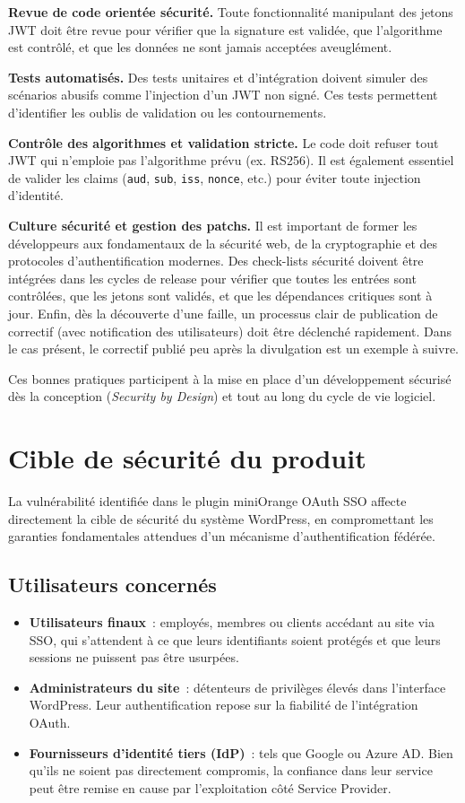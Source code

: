 \documentclass[a4paper,12pt]{article}
\begin{document}
\textbf{Revue de code orientée sécurité.} Toute fonctionnalité manipulant des jetons JWT doit être revue pour vérifier que la signature est validée, que l’algorithme est contrôlé, et que les données ne sont jamais acceptées aveuglément.

\textbf{Tests automatisés.} Des tests unitaires et d’intégration doivent simuler des scénarios abusifs comme l’injection d’un JWT non signé. Ces tests permettent d'identifier les oublis de validation ou les contournements.


\textbf{Contrôle des algorithmes et validation stricte.} Le code doit refuser tout JWT qui n’emploie pas l’algorithme prévu (ex. RS256). Il est également essentiel de valider les claims (\texttt{aud}, \texttt{sub}, \texttt{iss}, \texttt{nonce}, etc.) pour éviter toute injection d'identité.


\textbf{Culture sécurité et gestion des patchs.} Il est important de former les développeurs aux fondamentaux de la sécurité web, de la cryptographie et des protocoles d’authentification modernes. Des check-lists sécurité doivent être intégrées dans les cycles de release pour vérifier que toutes les entrées sont contrôlées, que les jetons sont validés, et que les dépendances critiques sont à jour. Enfin, dès la découverte d’une faille, un processus clair de publication de correctif (avec notification des utilisateurs) doit être déclenché rapidement. Dans le cas présent, le correctif publié peu après la divulgation est un exemple à suivre.

Ces bonnes pratiques participent à la mise en place d’un développement sécurisé dès la conception (\textit{Security by Design}) et tout au long du cycle de vie logiciel.


\section{Cible de sécurité du produit}

La vulnérabilité identifiée dans le plugin miniOrange OAuth SSO affecte directement la cible de sécurité du système WordPress, en compromettant les garanties fondamentales attendues d’un mécanisme d’authentification fédérée.

\subsection*{Utilisateurs concernés}
\begin{itemize}
  \item \textbf{Utilisateurs finaux}~: employés, membres ou clients accédant au site via SSO, qui s’attendent à ce que leurs identifiants soient protégés et que leurs sessions ne puissent pas être usurpées.
  \item \textbf{Administrateurs du site}~: détenteurs de privilèges élevés dans l’interface WordPress. Leur authentification repose sur la fiabilité de l’intégration OAuth.
  \item \textbf{Fournisseurs d’identité tiers (IdP)}~: tels que Google ou Azure AD. Bien qu’ils ne soient pas directement compromis, la confiance dans leur service peut être remise en cause par l’exploitation côté Service Provider.
\end{itemize}
\end{document}
